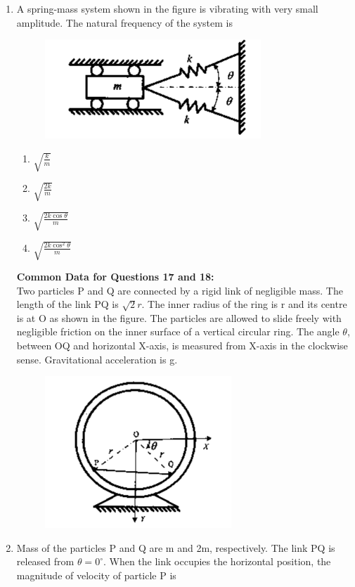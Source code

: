 \documentclass[a4paper,10pt]{article}
\begin{document}
\begin{enumerate}
\item A spring-mass system shown in the figure is vibrating with very small amplitude. The natural frequency of the system is
\begin{figure}[H]
    \centering
    \includegraphics[width=0.4\columnwidth]{Dq16.png}
    \caption*{}
    \label{fig:q16_solid}
\end{figure}
\hfill{}

\begin{multicols}{4}
\begin{enumerate}
\item $\sqrt{\frac{k}{m}}$
\item $\sqrt{\frac{2k}{m}}$
\item $\sqrt{\frac{2k \cos \theta}{m}}$
\item $\sqrt{\frac{2k \cos^2 \theta}{m}}$
\end{enumerate}
\end{multicols}

\textbf{Common Data for Questions 17 and 18:} \\
Two particles P and Q are connected by a rigid link of negligible mass. The length of the link PQ is $\sqrt{2} r$. The inner radius of the ring is r and its centre is at O as shown in the figure. The particles are allowed to slide freely with negligible friction on the inner surface of a vertical circular ring. The angle $\theta$, between OQ and horizontal X-axis, is measured from X-axis in the clockwise sense. Gravitational acceleration is g.
\begin{figure}[H]
    \centering
    \includegraphics[width=0.4\columnwidth]{Dq17_18.png}
    \caption*{}
    \label{fig:q17_18_solid}
\end{figure}

\item Mass of the particles P and Q are m and 2m, respectively. The link PQ is released from $\theta = 0^\circ$. When the link occupies the horizontal position, the magnitude of velocity of particle P is
\hfill{}


\end{enumerate}
\end{document}
